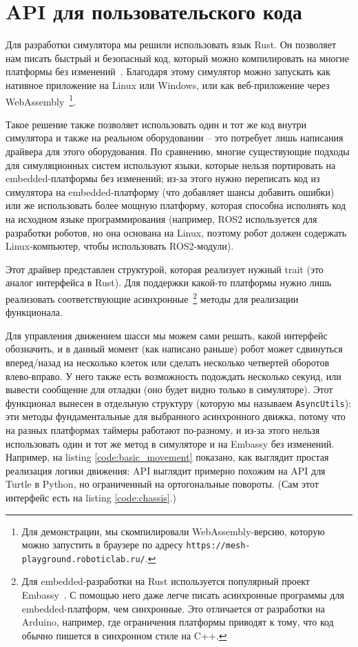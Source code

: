 \documentclass[%
]{report}
\begin{document}
\section{API для пользовательского кода}

Для разработки симулятора мы решили использовать язык Rust.
Он позволяет нам писать быстрый и безопасный код,
который можно компилировать на многие платформы без изменений~\cite{10.1145/2663171.2663188,klabnik2022rust}.
Благодаря этому симулятор можно запускать как нативное приложение на Linux или Windows,
или как веб-приложение через WebAssembly~\footnote{Для демонстрации,
мы скомпилировали WebAssembly-версию, которую можно запустить в браузере по адресу \texttt{https://mesh-playground.roboticlab.ru/}.}.

Такое решение также позволяет использовать один и тот же код внутри симулятора
и также на реальном оборудовании --
это потребует лишь написания драйвера для этого оборудования.
По сравнению, многие существующие подходы
для симуляционных систем
используют языки,
которые нельзя портировать на embedded-платформы без изменений;
из-за этого нужно переписать код из симулятора на embedded-платформу
(что добавляет шансы добавить ошибки)
или же использовать более мощную платформу, которая способна
исполнять код на исходном языке программирования
(например, ROS2 используется для разработки роботов,
но она основана на Linux, поэтому робот должен содержать
Linux-компьютер, чтобы использовать ROS2-модули).

Этот драйвер представлен структурой, которая реализует нужный trait (это аналог интерфейса в Rust).
Для поддержки какой-то платформы нужно лишь реализовать соответствующие асинхронные~\footnote{Для embedded-разработки
на Rust используется популярный проект Embassy~\cite{embassy}. С помощью него даже легче писать асинхронные программы
для embedded-платформ, чем синхронные. Это отличается от разработки на Arduino, например,
где ограничения платформы приводят к тому,
что код обычно пишется в синхронном стиле на C++.}
 методы для реализации функционала.

Для управления движением шасси мы можем сами решать, какой интерфейс обозначить,
и в данный момент (как написано раньше)
робот может сдвинуться вперед/назад на несколько клеток или сделать несколько четвертей оборотов
влево-вправо.
У него также есть возможность подождать несколько секунд,
или вывести сообщение для отладки
(оно будет видно только в симуляторе).
Этот функционал вынесен в отдельную структуру
(которую мы называем \texttt{AsyncUtils}):
эти методы фундаментальные для выбранного асинхронного движка,
потому что на разных платформах таймеры работают по-разному,
и из-за этого нельзя использовать один и тот же метод 
в симуляторе и на Embassy без изменений.
Например, на listing \ref{code:basic_movement} показано,
как выглядит простая реализация логики движения:
API выглядит примерно похожим на API для Turtle в Python,
но ограниченный на ортогональные повороты.
(Сам этот интерфейс есть на listing \ref{code:chassis}.)
\end{document}
